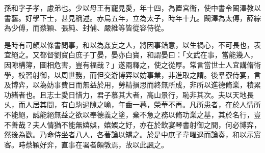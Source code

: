 \begin{pinyinscope}
 
 
 孫和字子孝，慮弟也。少以母王有寵見愛，年十四，為置宮衞，使中書令闞澤教以書藝。好學下士，甚見稱述。赤烏五年，立為太子，時年十九。闞澤為太傅，薛綜為少傅，而蔡穎、張純、封俌、嚴維等皆從容侍從。
 
 
 
 
 
 
 是時有司頗以條書問事，和以為姦妄之人，將因事錯意，以生禍心，不可長也，表宜絕之。又都督劉寶白庶子丁晏，晏亦白寶，和謂晏曰：「文武在事，當能幾人，因隙構簿，圖相危害，豈有福哉？」遂兩釋之，使之從厚。常言當世士人宜講脩術學，校習射御，以周世務，而但交游博弈以妨事業，非進取之謂。後羣寮侍宴，言及博弈，以為妨事費日而無益於用，勞精損思而終無所成，非所以進德脩業，積累功緒者也。且志士愛日惜力，君子慕其大者，高山景行，恥非其次。夫以天地長乆，而人居其間，有白駒過隙之喻，年齒一暮，榮華不再。凡所患者，在於人情所不能絕，誠能絕無益之欲以奉德義之塗，棄不急之務以脩功業之基，其於名行，豈不善哉？夫人情猶不能無嬉娛，嬉娛之好，亦在於飲宴琴書射御之間，何必博弈，然後為歡。乃命侍坐者八人，各著論以矯之。於是中庶子韋曜退而論奏，和以示賔客。時蔡穎好弈，直事在署者頗斆焉，故以此諷之。
 

\end{pinyinscope}

